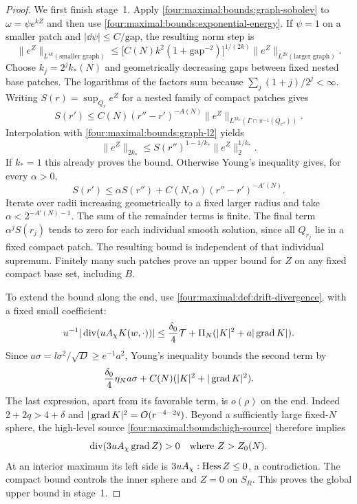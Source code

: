 \begin{proof}
We first finish stage~1. Apply \eqref{four:maximal:bounds:graph-sobolev} to
$\omega=\psi e^{kZ}$ and then use
\eqref{four:maximal:bounds:exponential-energy}. If $\psi=1$ on a smaller patch
and $|\dd\psi|\le C/\mathrm{gap}$, the resulting norm step is
\[
 \|e^Z\|_{L^{4k}(\text{smaller graph})}
 \le\bigl[C(N)k^2(1+\mathrm{gap}^{-2})\bigr]^{1/(2k)}
       \|e^Z\|_{L^{2k}(\text{larger graph})}.
\]
Choose $k_j=2^j k_*(N)$ and geometrically decreasing gaps between
fixed nested base patches. The logarithms of the factors sum because
$\sum_j (1+j)/2^j<\infty$. Writing $S(r)=\sup_{Q_r}e^Z$ for a
nested family of compact patches gives
\[
 S(r')\le C(N)(r''-r')^{-A(N)}
          \|e^Z\|_{L^{2k_*}(\Gamma\cap\pi^{-1}(Q_{r''}))}.
\]
Interpolation with \eqref{four:maximal:bounds:graph-l2} yields
\[
 \|e^Z\|_{2k_*}
     \le S(r'')^{1-1/k_*}\|e^Z\|_2^{1/k_*}.
\]
If $k_*=1$ this already proves the bound. Otherwise Young's inequality
gives, for every $\alpha>0$,
\[
 S(r')\le\alpha S(r'')
       +C(N,\alpha)(r''-r')^{-A'(N)}.
\]
Iterate over radii increasing geometrically to a fixed larger radius
and take $\alpha<2^{-A'(N)-1}$. The sum of the remainder terms is
finite. The final term $\alpha^j S(r_j)$ tends to zero for each
individual smooth solution, since all $Q_{r_j}$ lie in a fixed compact
patch. The resulting bound is independent of that individual
supremum. Finitely many such patches prove an upper bound for $Z$
on any fixed compact base set, including $B$.

To extend the bound along the end, use \eqref{four:maximal:def:drift-divergence},
with a fixed small coefficient:
\[
 u^{-1}|\operatorname{div}(uA_\chi K(w,\cdot))|
 \le\frac{\delta_0}{4}\mathcal T
       +\Pi_N(|K|^2+a|\operatorname{grad} K|).
\]
Since $a\sigma= l\sigma^2/\sqrt D\ge e^{-1}a^2$,
Young's inequality bounds the second term by
\[
 \frac{\delta_0}{4}\eta_N a\sigma
       +C(N)(|K|^2+|\operatorname{grad} K|^2).
\]
The last expression, apart from its favorable term, is $o(\rho)$
on the end. Indeed $2+2q>4+\delta$ and
$|\operatorname{grad} K|^2=O(r^{-4-2q})$.
Beyond a sufficiently large fixed-$N$ sphere, the high-level source
\eqref{four:maximal:bounds:high-source} therefore implies
\[
 \operatorname{div}(3uA_\chi\operatorname{grad} Z)>0
 \quad\hbox{where }Z>Z_0(N).
\]
At an interior maximum its left side is
$3uA_\chi:\operatorname{Hess} Z\le0$, a contradiction.
The compact bound controls the inner sphere and $Z=0$ on $S_R$.
This proves the global upper bound in stage~1.


\end{proof}
